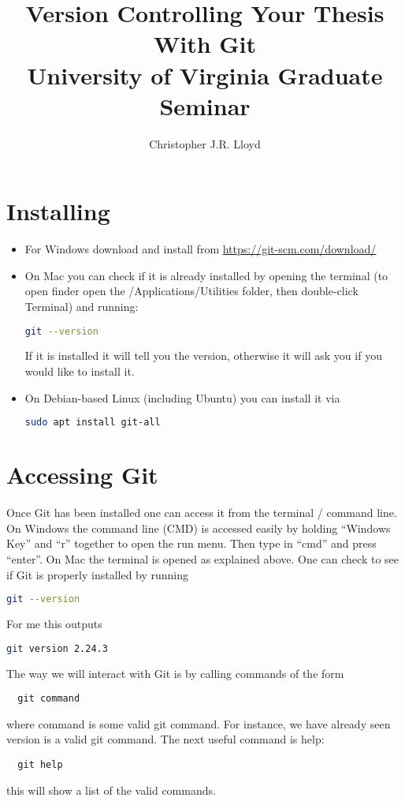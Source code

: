 \documentclass{article}
\title{Version Controlling Your Thesis With Git\\ {\large University of
  Virginia Graduate Seminar}}
\author{Christopher J.R. Lloyd}
\begin{document}
\maketitle
\section{Installing}
\begin{itemize}
\item For Windows download and install from \href{https://git-scm.com/download/}{https://git-scm.com/download/}
\item On Mac you can check if it is already installed by opening the
  terminal (to open finder open the /Applications/Utilities folder,
  then double-click Terminal) and running:
\begin{lstlisting}[language=bash]
  git --version
\end{lstlisting}
If it is installed it will tell you the version, otherwise it will ask
you if you would like to install it.
\item On Debian-based Linux (including Ubuntu) you can install it via
\begin{lstlisting}[language=bash]
  sudo apt install git-all
\end{lstlisting}
\end{itemize}
\section{Accessing Git}
Once Git has been installed one can access it from the terminal /
command line. On Windows the command line (CMD) is accessed easily by
holding ``Windows Key'' and ``r'' together to open the run menu. Then
type in ``cmd'' and press ``enter''. On Mac the terminal is
opened as explained above. One can check to see if Git is properly
installed by running
\begin{lstlisting}[language=bash]
  git --version
\end{lstlisting}
For me this outputs 
\begin{lstlisting}[language=bash]
  git version 2.24.3
\end{lstlisting}
The way we will interact with Git is by calling commands of the form
\begin{lstlisting}
  git command
\end{lstlisting}
where command is some valid git command. For instance, we have already
seen version is a valid git command. The next useful command is help:
\begin{lstlisting}
  git help
\end{lstlisting}
this will show a list of the valid commands.
\end{document}
